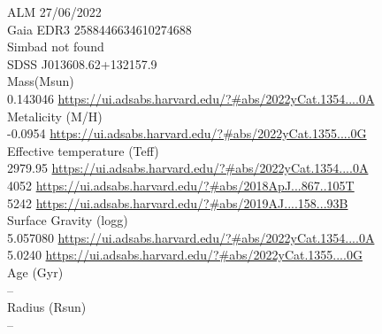 ALM 27/06/2022\\
Gaia EDR3 2588446634610274688\\
Simbad not found\\
SDSS J013608.62+132157.9\\
Mass(Msun)\\
0.143046 \url{https://ui.adsabs.harvard.edu/?#abs/2022yCat.1354....0A}\\
Metalicity (M/H)\\
-0.0954 \url{https://ui.adsabs.harvard.edu/?#abs/2022yCat.1355....0G}\\
Effective temperature (Teff) \\
2979.95	\url{https://ui.adsabs.harvard.edu/?#abs/2022yCat.1354....0A}\\
4052 \url{https://ui.adsabs.harvard.edu/?#abs/2018ApJ...867..105T}\\
5242 \url{https://ui.adsabs.harvard.edu/?#abs/2019AJ....158...93B}\\
Surface Gravity (logg) \\
5.057080 \url{https://ui.adsabs.harvard.edu/?#abs/2022yCat.1354....0A}\\
5.0240 \url{https://ui.adsabs.harvard.edu/?#abs/2022yCat.1355....0G}\\
Age (Gyr)\\
--\\
Radius (Rsun)\\
--\\

